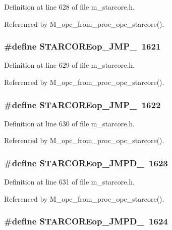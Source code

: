 Definition at line 628 of file m\_\-starcore.h.

Referenced by M\_\-opc\_\-from\_\-proc\_\-opc\_\-starcore().
\subsubsection{\setlength{\rightskip}{0pt plus 5cm}\#define STARCOREop\_\-JMP\_~1621}\label{m__starcore_8h_ec73be71c613a5cf9a49ecb57b973a01}




Definition at line 629 of file m\_\-starcore.h.

Referenced by M\_\-opc\_\-from\_\-proc\_\-opc\_\-starcore().
\subsubsection{\setlength{\rightskip}{0pt plus 5cm}\#define STARCOREop\_\-JMP\_~1622}\label{m__starcore_8h_b77c152d457eb3e0b0df27243364a540}




Definition at line 630 of file m\_\-starcore.h.

Referenced by M\_\-opc\_\-from\_\-proc\_\-opc\_\-starcore().
\subsubsection{\setlength{\rightskip}{0pt plus 5cm}\#define STARCOREop\_\-JMPD\_~1623}\label{m__starcore_8h_7529f245dfb5fc1b4abc6c44940471ce}




Definition at line 631 of file m\_\-starcore.h.

Referenced by M\_\-opc\_\-from\_\-proc\_\-opc\_\-starcore().
\subsubsection{\setlength{\rightskip}{0pt plus 5cm}\#define STARCOREop\_\-JMPD\_~1624}\label{m__starcore_8h_435e4cf7c799883650bc28d6c6a9c034}




